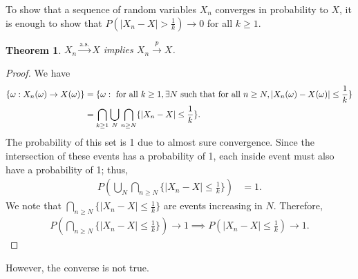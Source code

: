 \documentclass[15pt,a4paper]{book}
\newtheorem{theorem}{Theorem}[chapter]
\theoremstyle{definition}
\newcommand{\abs}[1]{\left| #1 \right|} %
\newcommand{\toup}[1]{\xrightarrow{#1}}
\begin{document}
To show that a sequence of random variables $X_{n}$ converges in probability to $X$, it is enough to show that $P(\abs{X_{n}-X} > \frac{1}{k}) \to 0$ for all $k \geq 1$.

\begin{theorem}
    $X_{n} \toup{\text{a.s.}} X$ implies $X_{n} \toup{p} X$.
\end{theorem}
\begin{proof}
    We have
    \begin{align}
        \{\omega:X_{n}(\omega) \to X(\omega)\} &= \{\omega: \text{ for all } k \geq 1, \exists N \text{ such that for all } n \geq N, \abs{X_{n}(\omega)-X(\omega)} \leq \frac{1}{k}\} \notag\\
        &= \bigcap_{k \geq 1} \bigcup_{N} \bigcap_{n \geq N} \{\abs{X_{n}-X} \leq \frac{1}{k}\}.
    \end{align}
    The probability of this set is 1 due to almost sure convergence. Since the intersection of these events has a probability of 1, each inside event must also have a probability of 1; thus,
    \begin{align}
        P(\bigcup_{N} \bigcap_{n \geq N} \{\abs{X_{n}-X} \leq \frac{1}{k}\}) &= 1.
    \end{align}
    We note that $\bigcap_{n \geq N} \{\abs{X_{n}-X} \leq \frac{1}{k}\}$ are events increasing in $N$. Therefore,
    \begin{align}
        P(\bigcap_{n \geq N} \{\abs{X_{n}-X} \leq \frac{1}{k}\}) \to 1 \implies P(\abs{X_{n}-X} \leq \frac{1}{k}) \to 1.
    \end{align}
\end{proof}
However, the converse is not true.



\end{document}
